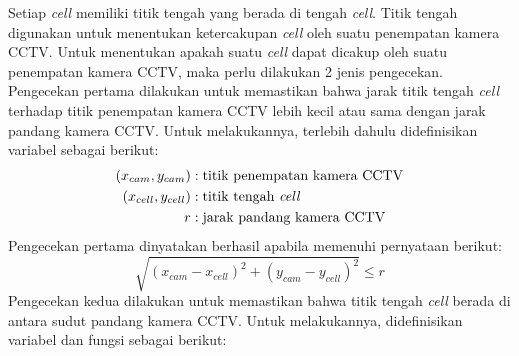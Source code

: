 Setiap \textit{cell} memiliki titik tengah yang berada di tengah \textit{cell}. Titik tengah digunakan untuk menentukan ketercakupan \textit{cell} oleh suatu penempatan kamera CCTV. Untuk menentukan apakah suatu \textit{cell} dapat dicakup oleh suatu penempatan kamera CCTV, maka perlu dilakukan 2 jenis pengecekan. Pengecekan pertama dilakukan untuk memastikan bahwa jarak titik tengah \textit{cell} terhadap titik penempatan kamera CCTV lebih kecil atau sama dengan jarak pandang kamera CCTV. Untuk melakukannya, terlebih dahulu didefinisikan variabel sebagai berikut:
\begin{equation}
	\begin{split}
		(x_{cam},y_{cam}) &: \text{titik penempatan kamera CCTV}\\
		(x_{cell},y_{cell}) &: \text{titik tengah \textit{cell}}\\
		r &: \text{jarak pandang kamera CCTV}
	\end{split}
\end{equation}
Pengecekan pertama dinyatakan berhasil apabila memenuhi pernyataan berikut:
\begin{equation}
	\sqrt{(x_{cam} - x_{cell})^2 + (y_{cam} - y_{cell})^2} \leq r
\end{equation}
Pengecekan kedua dilakukan untuk memastikan bahwa titik tengah \textit{cell} berada di antara sudut pandang kamera CCTV. Untuk melakukannya, didefinisikan variabel dan fungsi sebagai berikut:
